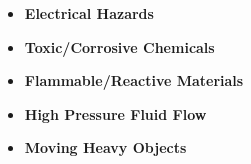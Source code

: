 \documentclass[12pt,oneside]{book}
\begin{document}
\begin{itemize}
\item {\bf Electrical Hazards}
\item {\bf Toxic/Corrosive Chemicals}
\item {\bf Flammable/Reactive Materials}
\item {\bf High Pressure Fluid Flow}
\item {\bf Moving Heavy Objects}
\end{itemize}
\end{document}
